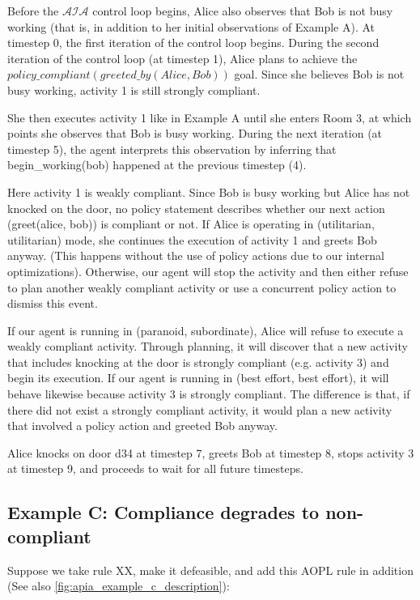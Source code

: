 Before the $\mathcal{AIA}$ control loop begins, Alice also observes that Bob is not busy working (that is, in addition to her initial observations of Example A).
At timestep 0, the first iteration of the control loop begins.
During the second iteration of the control loop (at timestep 1), Alice plans to achieve the $policy\_compliant(greeted\_by(Alice, Bob))$ goal.
Since she believes Bob is not busy working, activity 1 is still strongly compliant.

She then executes activity 1 like in Example A until she enters Room 3, at which points she observes that Bob is busy working.
During the next iteration (at timestep 5), the agent interprets this observation by inferring that begin\_working(bob) happened at the previous timestep (4).

Here activity 1 is weakly compliant.
Since Bob is busy working but Alice has not knocked on the door, no policy statement describes whether our next action (greet(alice, bob)) is compliant or not.
If Alice is operating in (utilitarian, utilitarian) mode, she continues the execution of activity 1 and greets Bob anyway.
(This happens without the use of policy actions due to our internal optimizations).
Otherwise, our agent will stop the activity and then either refuse to plan another weakly compliant activity or use a concurrent policy action to dismiss this event.

If our agent is running in (paranoid, subordinate), Alice will refuse to execute a weakly compliant activity.
Through planning, it will discover that a new activity that includes knocking at the door is strongly compliant (e.g. activity 3) and begin its execution.
If our agent is running in (best effort, best effort), it will behave likewise because activity 3 is strongly compliant.
The difference is that, if there did not exist a strongly compliant activity, it would plan a new activity that involved a policy action and greeted Bob anyway.


Alice knocks on door d34 at timestep 7, greets Bob at timestep 8, stops activity 3 at timestep 9, and proceeds to wait for all future timesteps.

\subsection{Example C: Compliance degrades to non-compliant}

Suppose we take rule XX, make it defeasible, and add this AOPL rule in addition (See also \cref{fig:apia_example_c_description}):

